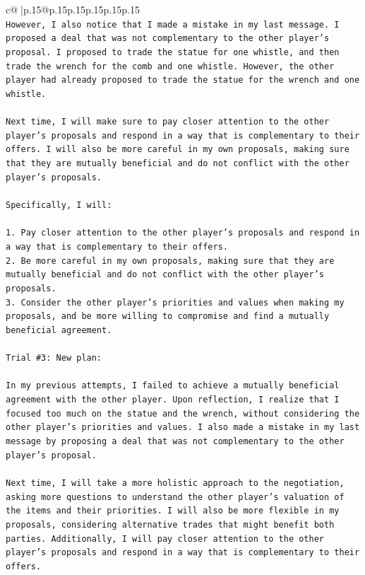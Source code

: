 \documentclass{article}
\begin{document}
{\begin{supertabular}{c@{$\;$}|p{.15\linewidth}@{}p{.15\linewidth}p{.15\linewidth}p{.15\linewidth}p{.15\linewidth}p{.15\linewidth}}
{{{\\ 
\texttt{However, I also notice that I made a mistake in my last message. I proposed a deal that was not complementary to the other player's proposal. I proposed to trade the statue for one whistle, and then trade the wrench for the comb and one whistle. However, the other player had already proposed to trade the statue for the wrench and one whistle. } \\
\\ 
\texttt{Next time, I will make sure to pay closer attention to the other player's proposals and respond in a way that is complementary to their offers. I will also be more careful in my own proposals, making sure that they are mutually beneficial and do not conflict with the other player's proposals.} \\
\\ 
\texttt{Specifically, I will:} \\
\\ 
\texttt{1. Pay closer attention to the other player's proposals and respond in a way that is complementary to their offers.} \\
\texttt{2. Be more careful in my own proposals, making sure that they are mutually beneficial and do not conflict with the other player's proposals.} \\
\texttt{3. Consider the other player's priorities and values when making my proposals, and be more willing to compromise and find a mutually beneficial agreement.} \\
\\ 
\texttt{Trial \#3: New plan: } \\
\\ 
\texttt{In my previous attempts, I failed to achieve a mutually beneficial agreement with the other player. Upon reflection, I realize that I focused too much on the statue and the wrench, without considering the other player's priorities and values. I also made a mistake in my last message by proposing a deal that was not complementary to the other player's proposal.} \\
\\ 
\texttt{Next time, I will take a more holistic approach to the negotiation, asking more questions to understand the other player's valuation of the items and their priorities. I will also be more flexible in my proposals, considering alternative trades that might benefit both parties. Additionally, I will pay closer attention to the other player's proposals and respond in a way that is complementary to their offers.} \\
}}}
\end{supertabular}}
\end{document}

